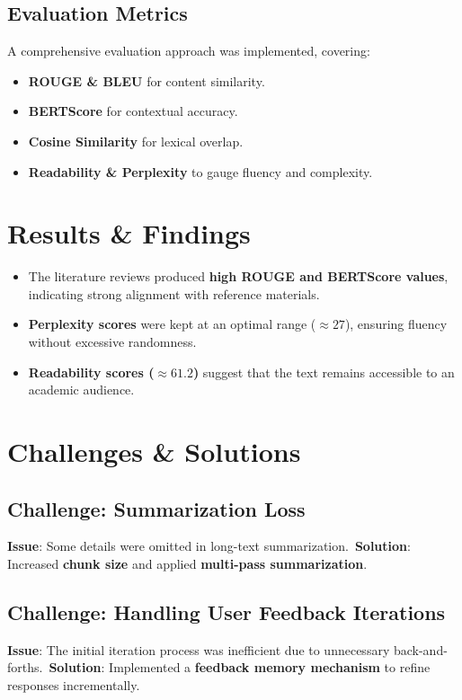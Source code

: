 \subsection{Evaluation Metrics}
A comprehensive evaluation approach was implemented, covering:
\begin{itemize}
\item \textbf{ROUGE & BLEU} for content similarity.
\item \textbf{BERTScore} for contextual accuracy.
\item \textbf{Cosine Similarity} for lexical overlap.
\item \textbf{Readability & Perplexity} to gauge fluency and complexity.
\end{itemize}

\section{Results & Findings}
\begin{itemize}
\item The literature reviews produced \textbf{high ROUGE and BERTScore values}, indicating strong alignment with reference materials.
\item \textbf{Perplexity scores} were kept at an optimal range ($\approx 27$), ensuring fluency without excessive randomness.
\item \textbf{Readability scores ($\approx 61.2$)} suggest that the text remains accessible to an academic audience.
\end{itemize}

\section{Challenges & Solutions}
\subsection{Challenge: Summarization Loss}
\textbf{Issue}: Some details were omitted in long-text summarization.\
\textbf{Solution}: Increased \textbf{chunk size} and applied \textbf{multi-pass summarization}.

\subsection{Challenge: Handling User Feedback Iterations}
\textbf{Issue}: The initial iteration process was inefficient due to unnecessary back-and-forths.\
\textbf{Solution}: Implemented a \textbf{feedback memory mechanism} to refine responses incrementally.

